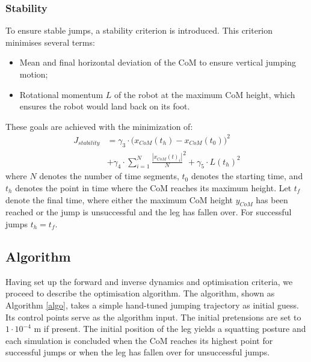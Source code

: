 \documentclass[letterpaper, 10 pt, conference]{ieeeconf}  %
\begin{document}
	\subsubsection{Stability}
	To ensure stable jumps, a stability criterion is introduced. This criterion minimises several terms:
	\begin{itemize}
		\item Mean and final horizontal deviation of the CoM to ensure vertical jumping motion;
		\item Rotational momentum $L$ of the robot at the maximum CoM height, which ensures the robot would land back on its foot.
	\end{itemize}
	These goals are achieved with the minimization of:
	\begin{equation}
	\begin{aligned}
	J_{stability} & =  \gamma_3\cdot \Big( x_{CoM}(t_h)-x_{CoM}(t_0) \Big)^2  \\ & +\gamma_4\cdot  {\sum^{N}_{i=1}\frac{| x_{CoM}(t)_i |}{N}}^2   
	+ \gamma_5  \cdot   L(t_h)^2 
	\end{aligned}
	\end{equation}
	where $N$ denotes the number of time segments, $t_0$ denotes the starting time, and $t_h$ denotes the point in time where the CoM reaches its maximum height. Let $t_f$ denote the final time, where either the maximum CoM height $y_{CoM}$ has been reached or the jump is unsuccessful and the leg has fallen over. For successful jumps $t_h=t_f$.
	
	\subsection{Algorithm}
	\label{subsec:algorithm}
	Having set up the forward and inverse dynamics and optimisation criteria, we proceed to describe the optimisation algorithm. The algorithm, shown as Algorithm \ref{algo}, takes a simple hand-tuned jumping trajectory as initial guess. Its control points serve as the algorithm input. The initial pretensions are set to $1 \cdot 10^{-4}$ m if present. 
	The initial position of the leg yields a squatting posture and each simulation is concluded when the CoM reaches its highest point for successful jumps or when the leg has fallen over for unsuccessful jumps. 
	
\end{document}
